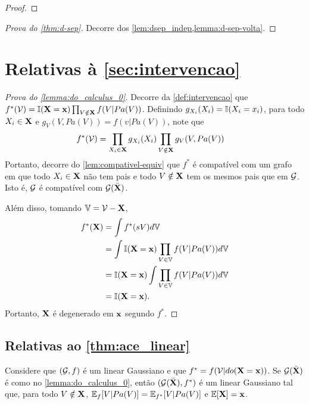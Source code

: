 \begin{proof}
\end{proof}

\begin{proof}[Prova do \cref{thm:d-sep}]
 Decorre dos 
 \cref{lem:dsep_indep,lemma:d-sep-volta}.
\end{proof}

\section{Relativas à \cref{sec:intervencao}}

\begin{proof}[Prova do \cref{lemma:do_calculus_0}]
 Decorre da \cref{def:intervencao} que
 $f^*({\mathcal V}) = {\mathbb I}({\mathbf{X}}={\mathbf{x}}) \prod_{V \notin {\mathbf{X}}}f(V|Pa(V))$.
 Definindo $g_{X_i}(X_i) = {\mathbb I}(X_i=x_i)$, para todo $X_i \in {\mathbf{X}}$ e
 $g_V(V,Pa(V)) = f(v|Pa(V))$, note que
 \begin{align*}
  f^*({\mathcal V})
  &= \prod_{X_i \in {\mathbf{X}}}g_{X_i}(X_i)
  \prod_{V \notin {\mathbf{X}}}g_V(V,Pa(V)) 
 \end{align*}
 Portanto, decorre do \cref{lem:compativel-equiv} que
 $f^*$ é compatível com um grafo em que
 todo $X_i \in {\mathbf{X}}$ não tem pais e
 todo $V \notin {\mathbf{X}}$ tem os mesmos pais que em ${\mathcal G}$.
 Isto é, ${\mathcal G}$ é compatível com ${\mathcal G}(\bar{{\mathbf{X}}})$.
 
 Além disso, tomando ${\mathbb V} = {\mathcal V} - {\mathbf{X}}$,
 \begin{align*}
  f^*({\mathbf{X}})
  &= \int f^*(sV) d{\mathbb V} \\
  &= \int {\mathbb I}({\mathbf{X}}={\mathbf{x}}) \prod_{V \in {\mathbb V}}f(V|Pa(V)) d{\mathbb V} \\
  &= {\mathbb I}({\mathbf{X}}={\mathbf{x}}) \int \prod_{V \in {\mathbb V}}f(V|Pa(V)) d{\mathbb V} \\
  &= {\mathbb I}({\mathbf{X}}={\mathbf{x}}).
 \end{align*}
 Portanto, ${\mathbf{X}}$ é degenerado em ${\mathbf{x}}$ segundo $f^*$.
\end{proof}

\subsection{Relativas ao \cref{thm:ace_linear}}

\begin{lemma}
 \label{lemma:linear_do}
 Considere que $({\mathcal G},f)$ é 
 um \CM linear Gaussiano e que
 $f^* = f({\mathcal V}|do({\mathbf{X}}={\mathbf{x}}))$.
 Se ${\mathcal G}(\bar{{\mathbf{X}}})$ é 
 como no \cref{lemma:do_calculus_0}, então
 $({\mathcal G}(\bar{{\mathbf{X}}}),f^*)$ é
 um \CM linear Gaussiano tal que,
 para todo $V \notin {\mathbf{X}}$,
 ${\mathbb E}_f[V|Pa(V)] = {\mathbb E}_{f^{*}}[V|Pa(V)]$ e
 ${\mathbb E}[{\mathbf{X}}] = {\mathbf{x}}$.
\end{lemma}

